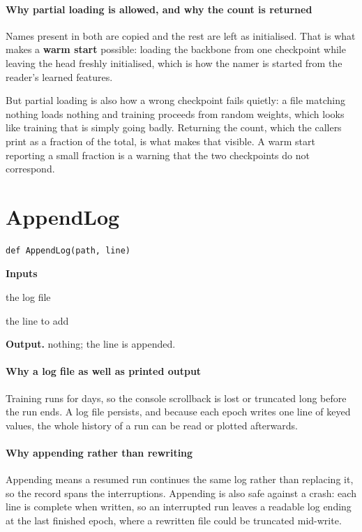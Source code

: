 \paragraph{Why partial loading is allowed, and why the count is returned}
Names present in both are copied and the rest are left as initialised. That is what makes a \textbf{warm start} possible: loading the backbone from one checkpoint while leaving the head freshly initialised, which is how the namer is started from the reader's learned features.

But partial loading is also how a wrong checkpoint fails quietly: a file matching nothing loads nothing and training proceeds from random weights, which looks like training that is simply going badly. Returning the count, which the callers print as a fraction of the total, is what makes that visible. A warm start reporting a small fraction is a warning that the two checkpoints do not correspond.


\section{AppendLog}
\begin{lstlisting}[style=sig]
def AppendLog(path, line)
\end{lstlisting}

\noindent\textbf{Inputs}
\begin{description}[leftmargin=2.2em,style=nextline,font=\normalfont\ttfamily]\setlength\itemsep{1pt}
  \item[{path}] \normalfont the log file
  \item[{line}] \normalfont the line to add
\end{description}

\noindent\textbf{Output.} nothing; the line is appended.


\paragraph{Why a log file as well as printed output}
Training runs for days, so the console scrollback is lost or truncated long before the run ends. A log file persists, and because each epoch writes one line of keyed values, the whole history of a run can be read or plotted afterwards.


\paragraph{Why appending rather than rewriting}
Appending means a resumed run continues the same log rather than replacing it, so the record spans the interruptions. Appending is also safe against a crash: each line is complete when written, so an interrupted run leaves a readable log ending at the last finished epoch, where a rewritten file could be truncated mid-write.


